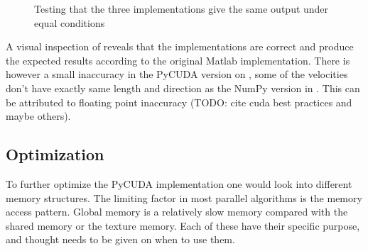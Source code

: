 \begin{figure}[H]
\centering
{}
\hspace{1pt}
\caption{Testing that the three implementations give the same output under equal conditions}
\label{correctness}
\end{figure}

A visual inspection of  reveals that the implementations are correct and produce the expected results according to the original Matlab implementation. There is however a small inaccuracy in the PyCUDA version on , some of the velocities don't have exactly same length and direction as the NumPy version in . This can be attributed to floating point inaccuracy (TODO: cite cuda best practices and maybe others).



\subsection{Optimization}
To further optimize the PyCUDA implementation one would look into different memory structures. The limiting factor in most parallel algorithms is the memory access pattern. Global memory is a relatively slow memory compared with the shared memory or the texture memory. Each of these have their specific purpose, and thought needs to be given on when to use them.

